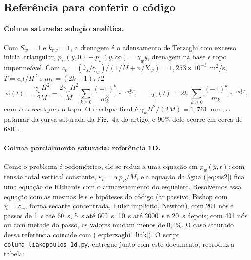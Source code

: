 \documentclass[11pt,a4paper]{article}
\begin{document}
\subsection{Referência para conferir o código}
\label{sec:liak_ref}

\paragraph{Coluna saturada: solução analítica.} Com $S_w=1$ e $k_{rw}=1$, a drenagem é o
adensamento de Terzaghi com excesso inicial triangular, $p_w(y,0)-p_w(y,\infty)=\gamma_wy$,
drenagem na base e topo impermeável. Com $c_v=(k_s/\gamma_w)/(1/M+n/K_w)
=1{,}253\times10^{-3}$~m$^2$/s, $T=c_vt/H^2$ e $m_k=(2k+1)\pi/2$,
\begin{equation}
w(t)=\frac{\gamma_wH^2}{2M}-\frac{2\gamma_wH^2}{M}\sum_{k\ge0}\frac{(-1)^k}{m_k^3}\,e^{-m_k^2T},\qquad
q_b(t)=2k_s\sum_{k\ge0}\frac{(-1)^k}{m_k}\,e^{-m_k^2T},
\label{eq:terzaghi_liak}
\end{equation}
com $w$ o recalque do topo. O recalque final é $\gamma_wH^2/(2M)=1{,}761$~mm, o patamar da
curva saturada da Fig.~4a do artigo, e 90\% dele ocorre em cerca de 680~s.

\paragraph{Coluna parcialmente saturada: referência 1D.} Como o problema é oedométrico, ele
se reduz a uma equação em $p_w(y,t)$: com tensão total vertical constante,
$\varepsilon_v=\alpha\,p_B/M$, e a equação da água (\ref{eq:sis2}) fica uma equação de Richards
com o armazenamento do esqueleto. Resolvemos essa equação com as mesmas leis e hipóteses do
código (ar passivo, Bishop com $\chi=S_w$, forma secante concentrada, Euler implícito, Newton),
com 201 nós e passos de 1~s até 60~s, 5~s até 600~s, 10~s até 2000~s e 20~s depois; com
401 nós ou com metade do passo, os valores mudam menos de 0,1\%. O caso saturado dessa
referência coincide com (\ref{eq:terzaghi_liak}). O script \texttt{coluna\_liakopoulos\_1d.py},
entregue junto com este documento, reproduz a tabela:
\end{document}
